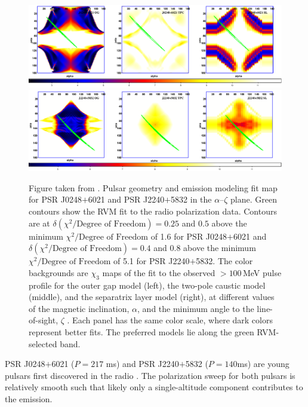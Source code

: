 \begin{figure}[t!!]
\includegraphics[width=1\textwidth]{chapters/multiWaveLength/figures/New_J0248_OGTPCSL.eps}
\includegraphics[width=1\textwidth]{chapters/multiWaveLength/figures/New_J2240_OGTPCSL.eps}
\caption[Pulsar geometry and emission modeling fit map for PSR J0248$+$6021 and PSR J2240$+$5832 in the $\alpha$--$\zeta$ plane]{Figure taken from \cite{theureau2011psrs}.
Pulsar geometry and emission modeling fit map for PSR J0248$+$6021 and PSR J2240$+$5832
in the $\alpha$--$\zeta$ plane. Green 
contours show the RVM fit to the radio polarization data. 
Contours are at $\delta(\chi^2/\text{Degree of Freedom}) = 0.25$ and $0.5$ above the minimum $\chi^2/\text{Degree of Freedom}$ of 1.6
for PSR J0248$+$6021 and $\delta(\chi^2/\text{Degree of Freedom}) = 0.4$ and $0.8$ above the minimum $\chi^2/\text{Degree of Freedom}$ of 5.1
for PSR J2240$+$5832.
The color backgrounds are $\chi_3$ maps of the fit to the observed $>100$\,MeV
pulse profile for the outer gap model (left),
the two-pole caustic model (middle), and the separatrix layer model (right), 
at different values of the magnetic inclination,
$\alpha$, and the minimum angle to the line-of-sight, $\zeta$ \citep{romani2010constraining}.
Each panel has the same color scale, where dark colors represent better fits. The
preferred models lie along the green RVM-selected band.
}
\label{OGTPC}
\end{figure}


PSR J0248$+$6021 ($P=217$ ms) and PSR J2240$+$5832 ($P=140$ms) are young pulsars first discovered in the radio
\citep{foster1997fast,ray1999j0248+}.  The polarization sweep for both pulsars is relatively smooth
such that likely only a single-altitude component contributes to the emission.


